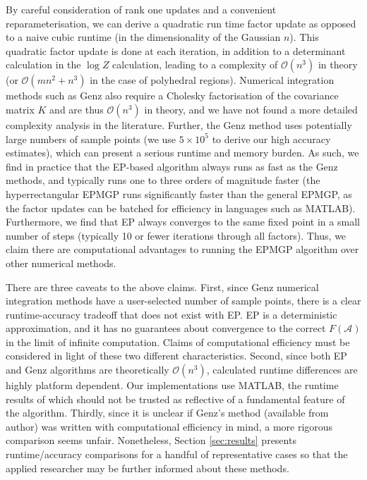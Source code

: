 \documentclass[twoside,11pt]{article}
\def\regionA{\mathcal{A}}
\begin{document}
By careful consideration of rank one updates and a convenient reparameterisation, we can derive a quadratic run time factor update as opposed to a naive cubic runtime (in the dimensionality of the Gaussian $n$).  This quadratic factor update is done at each iteration, in addition to a determinant calculation in the $\log Z$ calculation, leading to a complexity of $\mathcal{O}(n^3)$ in theory (or $\mathcal{O}(mn^2 + n^3)$ in the case of polyhedral regions).  Numerical integration methods such as Genz also require a Cholesky factorisation of the covariance matrix $K$ and are thus $\mathcal{O}(n^3)$ in theory, and we have not found a more detailed complexity analysis in the literature.  Further, the Genz method uses potentially large numbers of sample points (we use $5\times 10^5$ to derive our high accuracy estimates), which can present a serious runtime and memory burden.    As such, we find in practice that the EP-based algorithm always runs as fast as the Genz methods, and typically runs one to three orders of magnitude faster (the hyperrectangular EPMGP runs significantly faster than the general EPMGP, as the factor updates can be batched for efficiency in languages such as MATLAB).  Furthermore, we find that EP always converges to the same fixed point in a small number of steps (typically 10 or fewer iterations through all factors).    Thus, we claim there are computational advantages to running the EPMGP algorithm over other numerical methods.

There are three caveats to the above claims.  First, since Genz numerical integration methods have a user-selected number of sample points, there is a clear runtime-accuracy tradeoff that does not exist with EP.  EP is a deterministic approximation, and it has no guarantees about convergence to the correct $F(\regionA)$ in the limit of infinite computation.  Claims of computational efficiency must be considered in light of these two different characteristics.  Second, since both EP and Genz algorithms are theoretically $\mathcal{O}(n^3)$, calculated runtime differences are highly platform dependent.  Our implementations use MATLAB, the runtime results of which should not be trusted as reflective of a fundamental feature of the algorithm.  Thirdly, since it is unclear if Genz's method  (available from author) was written with computational efficiency in mind, a more rigorous comparison seems unfair.  Nonetheless, Section \ref{sec:results} presents runtime/accuracy comparisons for a handful of representative cases so that the applied researcher may be further informed about these methods.
\end{document}
